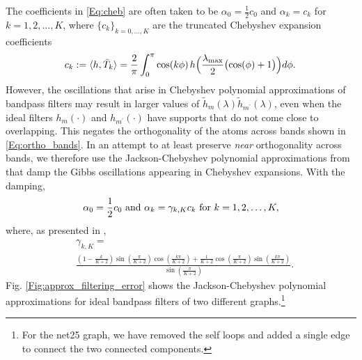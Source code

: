 \documentclass[journal, 10pt]{IEEEtran}
\begin{document}
The coefficients in \eqref{Eq:cheb} are often taken to be $\alpha_0=\frac{1}{2}c_0$ and $\alpha_k=c_k$ for $k=1,2,\ldots,K$, where  $\{c_k\}_{k=0,\ldots,K}$ are the truncated Chebyshev expansion coefficients 
\begin{align}\label{Eq:cheb_coeff}
\hspace{-.1in}c_{k}:=\langle h , \bar{T}_k \rangle = \frac{2}{\pi}\int_{0}^{\pi}\cos(k\phi)\hspace{.02in}h\Bigl(\frac{\lambda_{\max}}{2} \bigl(\cos(\phi) +1\bigr)\Bigr)d\phi.\hspace{-.08in}
\end{align}
However, the oscillations that arise in Chebyshev polynomial approximations of bandpass filters may result in larger values of $\tilde{h}_m(\lambda)\tilde{h}_{m^{\prime}}(\lambda)$, even when the ideal filters $h_m(\cdot)$ and $h_{m^{\prime}}(\cdot)$ have supports that do not come close to overlapping. This negates the orthogonality of the atoms across bands shown in \eqref{Eq:ortho_bands}. In an attempt to at least preserve \emph{near} orthogonality across bands, we 
therefore use the Jackson-Chebyshev polynomial approximations from \cite{di2016efficient,puy_structured_sampling} that damp the Gibbs oscillations appearing in Chebyshev expansions. With the damping, 
\begin{align}\label{Eq:damping1}
\alpha_0=\frac{1}{2}c_0 \hbox{ and }\alpha_k=\gamma_{k,K}c_k \hbox{ for }k=1,2,\ldots,K, 
\end{align}
where, as presented in \cite{di2016efficient}, 
\begin{align}
&\gamma_{k,K} =\label{Eq:damping2}\\
& \frac{(1-\frac{k}{K+2})\sin(\frac{\pi}{K+2})\cos(\frac{k\pi}{K+2})+\frac{1}{K+2}\cos(\frac{\pi}{K+2})\sin(\frac{k\pi}{K+2})}{\sin(\frac{\pi}{K+2})}.  \nonumber
\end{align}
Fig. \ref{Fig:approx_filtering_error} shows the Jackson-Chebyshev polynomial approximations for ideal bandpass filters of two different graphs.\footnote{For the net25 graph, we have removed the self loops and added a single edge to connect the two connected components.}
\end{document}
